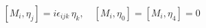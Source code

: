 \begin{equation}\label{8}
 [M_i, \eta_j] = i\epsilon_{ijk}\, \eta_k, \quad [M_i, \eta_0]=[M_i, \eta_4] =0
\end{equation}

